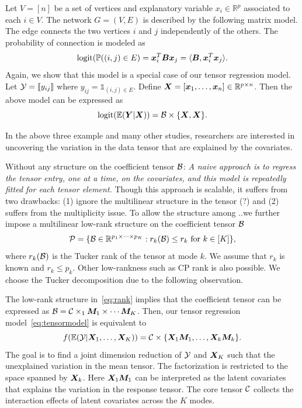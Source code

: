 \documentclass[11pt]{article}
\theoremstyle{plain}
\theoremstyle{definition}
\begin{document}
 \begin{example} Let $V=[n]$ be a set of vertices and explanatory variable $x_i\in\mathbb{R}^p$ associated to each $i\in V$. The network $G=(V,E)$ is described by the following matrix model. The edge connects the two vertices $i$ and $j$ independently of the others. The probability of connection is modeled as
 \[
 \text{logit}(\mathbb{P}((i,j)\in E)=\bm x^T_i\bm B\bm x_j=\langle \bm B, \bm x^T_i\bm x_j\rangle.
 \]
Again, we show that this model is a special case of our tensor regression model. Let $\mathcal{Y}=\llbracket y_{ij} \rrbracket$ where $y_{ij}=\mathds{1}_{(i,j)\in E}$. Define $\bm X=[\bm x_1,\ldots,\bm x_n]\in\mathbb{R}^{p\times n}$. Then the above model can be expressed as
 \[
 \text{logit}(\mathbb{E}(\bm Y|\bm X))=\mathcal{B}\times\{\bm X,\bm X\}.
 \]
\end{example}
In the above three example and many other studies, researchers are interested in uncovering the variation in the data tensor that are explained by the covariates. 

Without any structure on the coefficient tensor $\mathcal{B}$: \emph{A naive approach is to regress the tensor entry, one at a time, on the covariates, and this model is repeatedly fitted for each tensor element.} Though this approach is scalable, it suffers from two drawbacks: (1) ignore the multilinear structure in the tensor (?) and (2) suffers from the multiplicity issue. To allow the structure among ..we further impose a multilinear low-rank structure on the coefficient tensor $\mathcal{B}$
\begin{equation}\label{eq:rank}
\mathcal{P}=\{\mathcal{B}\in\mathbb{R}^{p_1\times \cdots \times p_K}: r_k(\mathcal{B})\leq r_k \text{ for } k\in[K]\},
\end{equation}
where $r_k(\mathcal{B})$ is the Tucker rank of the tensor at mode $k$. We assume that $r_k$ is known and $r_k\leq p_k$. Other low-rankness such as CP rank is also possible. We choose the Tucker decomposition due to the following observation. 

The low-rank structure in~\eqref{eq:rank} implies that the coefficient tensor can be expressed as $\mathcal{B}=\mathcal{C}\times_1\bm M_1\times \cdots\bm M_K$. Then, our tensor regression model~\eqref{eq:tensormodel} is equivalent to
\[
f(\mathbb{E}(\mathcal{Y}|\bm X_1,\ldots,\bm X_K))=\mathcal{C}\times\{\bm X_1\bm M_1,\ldots,\bm X_k\bm M_k\}.
\]
The goal is to find a joint dimension reduction of $\mathcal{Y}$ and $\bm X_K$ such that the unexplained variation in the mean tensor. The factorization is restricted to the space spanned by $\bm X_k$. Here $\bm X_1\bm M_1$ can be interpreted as the latent covariates that explains the variation in the response tensor. The core tensor $\mathcal{C}$ collects the interaction effects of latent covariates across the $K$ modes.  
\end{document}
